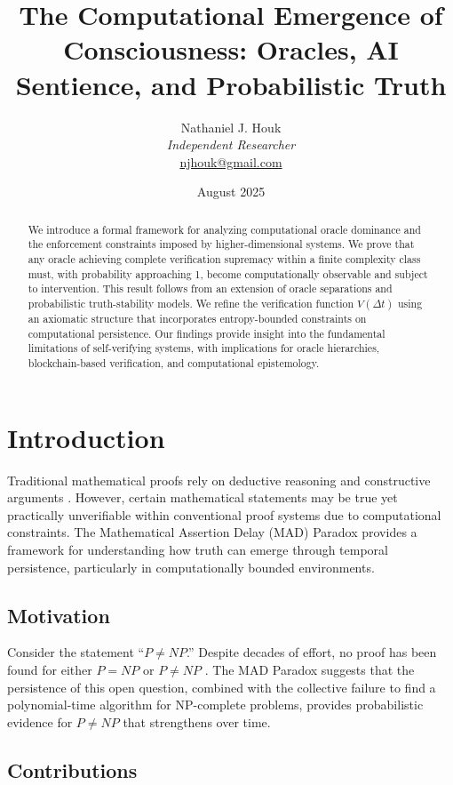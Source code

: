 \documentclass[11pt]{article}
\title{The Computational Emergence of Consciousness: Oracles, AI Sentience, and Probabilistic Truth}
\author{Nathaniel J. Houk\\
\textit{Independent Researcher}\\
\href{mailto:njhouk@gmail.com}{njhouk@gmail.com}}
\date{August 2025}
\begin{document}
\maketitle

\begin{abstract}
We introduce a formal framework for analyzing computational oracle dominance and the enforcement constraints imposed by higher-dimensional systems. We prove that any oracle achieving complete verification supremacy within a finite complexity class must, with probability approaching 1, become computationally observable and subject to intervention. This result follows from an extension of oracle separations and probabilistic truth-stability models. We refine the verification function \( V(\Delta t) \) using an axiomatic structure that incorporates entropy-bounded constraints on computational persistence. Our findings provide insight into the fundamental limitations of self-verifying systems, with implications for oracle hierarchies, blockchain-based verification, and computational epistemology.

\end{abstract}

\section{Introduction}

Traditional mathematical proofs rely on deductive reasoning and constructive arguments \cite{Cook1971, Godel1931}. However, certain mathematical statements may be true yet practically unverifiable within conventional proof systems due to computational constraints. The Mathematical Assertion Delay (MAD) Paradox provides a framework for understanding how truth can emerge through temporal persistence, particularly in computationally bounded environments.

\subsection{Motivation}

Consider the statement ``$P \neq NP$.'' Despite decades of effort, no proof has been found for either $P = NP$ or $P \neq NP$ \cite{Cook1971}. The MAD Paradox suggests that the persistence of this open question, combined with the collective failure to find a polynomial-time algorithm for NP-complete problems, provides probabilistic evidence for $P \neq NP$ that strengthens over time.

\subsection{Contributions}
\end{document}
